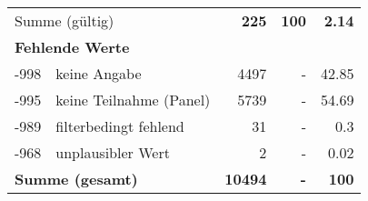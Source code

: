 \begin{longtable}{lXrrr}
     \midrule
     \multicolumn{2}{l}{Summe (gültig)} &
       \textbf{\num{225}} &
     \textbf{\num{100}} &
       \textbf{\num[round-mode=places,round-precision=2]{2.14}} \\
     \multicolumn{5}{l}{\textbf{Fehlende Werte}}\\
       -998 &
       keine Angabe &
         \num{4497} &
        - &
         \num[round-mode=places,round-precision=2]{42.85} \\
       -995 &
       keine Teilnahme (Panel) &
         \num{5739} &
        - &
         \num[round-mode=places,round-precision=2]{54.69} \\
       -989 &
       filterbedingt fehlend &
         \num{31} &
        - &
         \num[round-mode=places,round-precision=2]{0.3} \\
       -968 &
       unplausibler Wert &
         \num{2} &
        - &
         \num[round-mode=places,round-precision=2]{0.02} \\
     \midrule
     \multicolumn{2}{l}{\textbf{Summe (gesamt)}} &
          \textbf{\num{10494}} &
        \textbf{-} &
        \textbf{\num{100}} \\
     \bottomrule
     \end{longtable}
     
